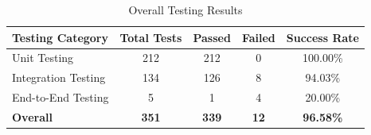 \begin{table}[H]
    \centering
    \caption{Overall Testing Results}
    \label{tab:overall-testing-results}
    \renewcommand{\arraystretch}{1.3}
    \begin{tabular}{|l|c|c|c|c|}
        \hline
        \textbf{Testing Category} &
        \textbf{Total Tests} &
        \textbf{Passed} &
        \textbf{Failed} &
        \textbf{Success Rate} \\
        \hline
        Unit Testing & 212 & 212 & 0 & 100.00\% \\
        \hline
        Integration Testing & 134 & 126 & 8 & 94.03\% \\
        \hline
        End-to-End Testing & 5 & 1 & 4 & 20.00\% \\
        \hline
        \textbf{Overall} &
        \textbf{351} &
        \textbf{339} &
        \textbf{12} &
        \textbf{96.58\%} \\
        \hline
    \end{tabular}
\end{table}